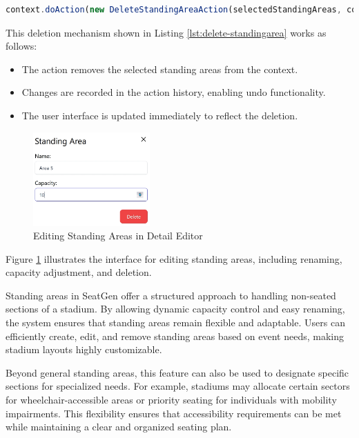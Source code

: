 \begin{lstlisting}[language=TypeScript, caption=Deleting Standing Areas, label=lst:delete-standingarea]
context.doAction(new DeleteStandingAreaAction(selectedStandingAreas, context))
\end{lstlisting}

This deletion mechanism shown in Listing \ref{lst:delete-standingarea} works as follows:
\begin{itemize}
    \item The action removes the selected standing areas from the context.
    \item Changes are recorded in the action history, enabling undo functionality.
    \item The user interface is updated immediately to reflect the deletion.
\end{itemize}

\begin{figure}[H]
    \centering
    \includegraphics[width=0.4\textwidth]{pics/DetailEditorStandingArea.png}
    \caption{Editing Standing Areas in Detail Editor}
    \label{fig:detail-editor-standingarea}
\end{figure}

Figure \ref{fig:detail-editor-standingarea} illustrates the interface for editing standing areas, including renaming, capacity adjustment, and deletion.

Standing areas in SeatGen offer a structured approach to handling non-seated sections of a stadium. By allowing dynamic capacity control and easy renaming, the system ensures that standing areas remain flexible and adaptable. Users can efficiently create, edit, and remove standing areas based on event needs, making stadium layouts highly customizable.

Beyond general standing areas, this feature can also be used to designate specific sections for specialized needs. For example, stadiums may allocate certain sectors for wheelchair-accessible areas or priority seating for individuals with mobility impairments. This flexibility ensures that accessibility requirements can be met while maintaining a clear and organized seating plan.

